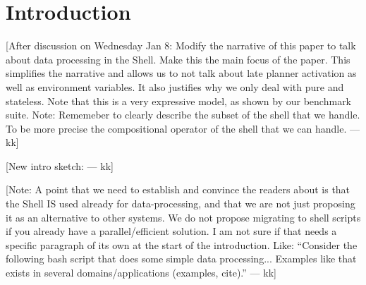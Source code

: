 \documentclass[sigplan,10pt,review,anonymous]{acmart}
\newcommand{\kk}[1]{[{\color{magenta}#1 --- kk}]}
\begin{document}




\maketitle


\section{Introduction}
\label{intro}

\kk{After discussion on Wednesday Jan 8: Modify the narrative of this
  paper to talk about data processing in the Shell. Make this the main
  focus of the paper. This simplifies the narrative and allows us to
  not talk about late planner activation as well as environment
  variables. It also justifies why we only deal with pure and
  stateless. Note that this is a very expressive model, as shown by
  our benchmark suite. Note: Rememeber to clearly describe the subset
  of the shell that we handle. To be more precise the compositional
  operator of the shell that we can handle.}

\kk{New intro sketch:}

\kk{Note: A point that we need to establish and convince the readers
  about is that the Shell IS used already for data-processing, and
  that we are not just proposing it as an alternative to other
  systems. We do not propose migrating to shell scripts if you already
  have a parallel/efficient solution. I am not sure if that needs a
  specific paragraph of its own at the start of the
  introduction. Like: ``Consider the following bash script that does
  some simple data processing... Examples like that exists in several
  domains/applications (examples, cite).''}
\end{document}
